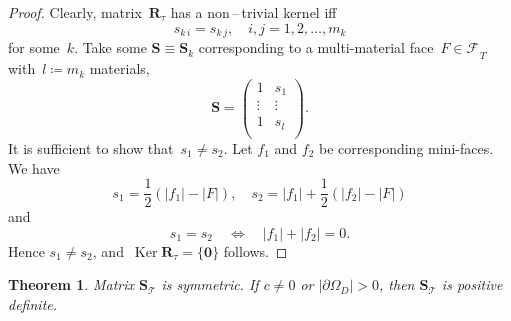 \documentclass[12pt]{article}
\newcommand{\vect}[1]{\boldsymbol{\mathbf{#1}}}
\newcommand{\bcell}{T}
\newcommand{\bmesh}{{\vect{\mathcal T}}}
\newcommand{\mmesh}{{\vect{\mathcal \tau}}}
\newcommand{\bfaces}[1][]{{\vect{\mathcal F}_{\text{#1}}}}
\DeclareMathOperator{\Ker}{Ker}
\newtheorem{theorem}{Theorem}[section]
\begin{document}
\begin{proof}
		Clearly, matrix~$\vect R_\mmesh$ has a non\,--\,trivial kernel iff
		\begin{equation*}
			 s_{k\,i} =  s_{k\,j}, \quad i, j = 1, 2, \dots, m_k
		\end{equation*}
		for some~$k$. Take some $\vect S \equiv \vect S_k$ corresponding to a multi-material face~$F \in \bfaces_\bcell$ with~${l \coloneqq m_k}$ materials,
		\begin{equation*}
			\vect S = \begin{pmatrix}
				1 &  s_1 \\
				\vdots & \vdots \\
				1 &  s_l \\
			\end{pmatrix}.
		\end{equation*}
		It is sufficient to show that~$ s_1 \ne  s_2$. Let $f_1$ and $f_2$ be corresponding mini-faces. We have
		\[
			 s_1 = \frac{1}{2}\left( |f_1| - |F| \right), \quad
			 s_2 = |f_1| + \frac{1}{2}\left( |f_2| - |F| \right)
		\]
		and
		\begin{equation*}
			 s_1 =  s_2 \quad\Leftrightarrow\quad |f_1| + |f_2| = 0.
		\end{equation*}
		Hence $ s_1 \ne  s_2$, and~$\Ker\vect R_\mmesh = \{ {\vect 0} \}$ follows.
		
	\end{proof}

	\begin{theorem} Matrix $\vect S_\bmesh$ is symmetric. If $c \ne 0$ or $|\partial\Omega_D|>0 $, then  $\vect S_\bmesh$ is positive definite.
	\end{theorem}
\end{document}
